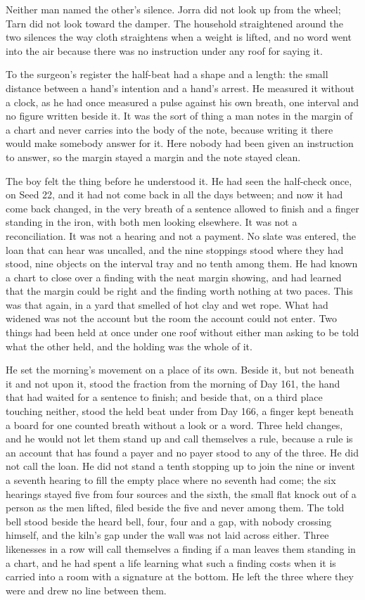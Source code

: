 Neither man named the other's silence. Jorra did not look up from the wheel; Tarn did not look toward the damper. The household straightened around the two silences the way cloth straightens when a weight is lifted, and no word went into the air because there was no instruction under any roof for saying it.

To the surgeon's register the half-beat had a shape and a length: the small distance between a hand's intention and a hand's arrest. He measured it without a clock, as he had once measured a pulse against his own breath, one interval and no figure written beside it. It was the sort of thing a man notes in the margin of a chart and never carries into the body of the note, because writing it there would make somebody answer for it. Here nobody had been given an instruction to answer, so the margin stayed a margin and the note stayed clean.

The boy felt the thing before he understood it. He had seen the half-check once, on Seed 22, and it had not come back in all the days between; and now it had come back changed, in the very breath of a sentence allowed to finish and a finger standing in the iron, with both men looking elsewhere. It was not a reconciliation. It was not a hearing and not a payment. No slate was entered, the loan that can hear was uncalled, and the nine stoppings stood where they had stood, nine objects on the interval tray and no tenth among them. He had known a chart to close over a finding with the neat margin showing, and had learned that the margin could be right and the finding worth nothing at two paces. This was that again, in a yard that smelled of hot clay and wet rope. What had widened was not the account but the room the account could not enter. Two things had been held at once under one roof without either man asking to be told what the other held, and the holding was the whole of it.

\scenebreak

He set the morning's movement on a place of its own. Beside it, but not beneath it and not upon it, stood the fraction from the morning of Day 161, the hand that had waited for a sentence to finish; and beside that, on a third place touching neither, stood the held beat under  from Day 166, a finger kept beneath a board for one counted breath without a look or a word. Three held changes, and he would not let them stand up and call themselves a rule, because a rule is an account that has found a payer and no payer stood to any of the three. He did not call the loan. He did not stand a tenth stopping up to join the nine or invent a seventh hearing to fill the empty place where no seventh had come; the six hearings stayed five from four sources and the sixth, the small flat knock out of a person as the men lifted, filed beside the five and never among them. The told bell stood beside the heard bell, four, four and a gap, with nobody crossing himself, and the kiln's gap under the wall was not laid across either. Three likenesses in a row will call themselves a finding if a man leaves them standing in a chart, and he had spent a life learning what such a finding costs when it is carried into a room with a signature at the bottom. He left the three where they were and drew no line between them.

